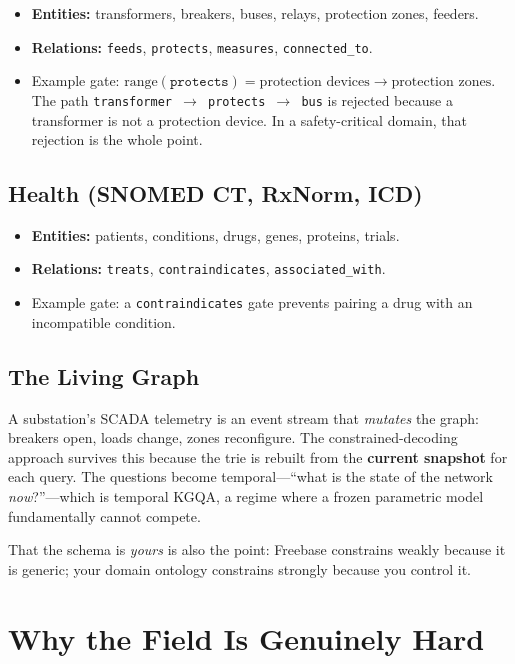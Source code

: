 \documentclass[11pt,a4paper]{article}
\newcommand{\range}{\mathrm{range}}
\begin{document}
\begin{itemize}
  \item \textbf{Entities:} transformers, breakers, buses, relays,
    protection zones, feeders.
  \item \textbf{Relations:} \texttt{feeds}, \texttt{protects},
    \texttt{measures}, \texttt{connected\_to}.
  \item Example gate: $\range(\texttt{protects}) = \text{protection
    devices} \to \text{protection zones}$.  The path
    \texttt{transformer $\to$ protects $\to$ bus} is rejected because a
    transformer is not a protection device.  In a safety-critical
    domain, that rejection is the whole point.
\end{itemize}

\subsection{Health (SNOMED CT, RxNorm, ICD)}

\begin{itemize}
  \item \textbf{Entities:} patients, conditions, drugs, genes,
    proteins, trials.
  \item \textbf{Relations:} \texttt{treats}, \texttt{contraindicates},
    \texttt{associated\_with}.
  \item Example gate: a \texttt{contraindicates} gate prevents pairing a
    drug with an incompatible condition.
\end{itemize}

\subsection{The Living Graph}

A substation's SCADA telemetry is an event stream that \emph{mutates}
the graph: breakers open, loads change, zones reconfigure.  The
constrained-decoding approach survives this because the trie is rebuilt
from the \textbf{current snapshot} for each query.  The questions become
temporal---``what is the state of the network \emph{now}?''---which is
temporal KGQA, a regime where a frozen parametric model fundamentally
cannot compete.

That the schema is \emph{yours} is also the point: Freebase constrains
weakly because it is generic; your domain ontology constrains strongly
because you control it.

\section{Why the Field Is Genuinely Hard}
\end{document}
